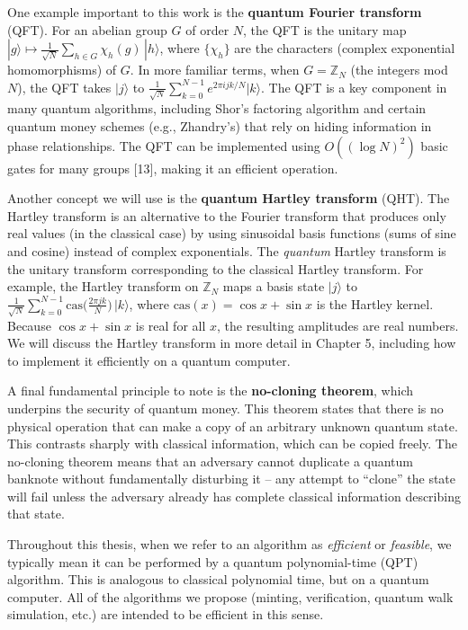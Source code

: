 \documentclass[11pt]{article}
\theoremstyle{definition}
\begin{document}
One example important to this work is the \textbf{quantum Fourier transform} (QFT). For an abelian group $G$ of order $N$, the QFT is the unitary map $|g\rangle \mapsto \frac{1}{\sqrt{N}}\sum_{h \in G} \chi_h(g)\, |h\rangle$, where $\{\chi_h\}$ are the characters (complex exponential homomorphisms) of $G$. In more familiar terms, when $G = \mathbb{Z}_N$ (the integers mod $N$), the QFT takes $|j\rangle$ to $\frac{1}{\sqrt{N}}\sum_{k=0}^{N-1} e^{2\pi i j k / N} |k\rangle$. The QFT is a key component in many quantum algorithms, including Shor’s factoring algorithm and certain quantum money schemes (e.g., Zhandry’s) that rely on hiding information in phase relationships. The QFT can be implemented using $O((\log N)^2)$ basic gates for many groups [13], making it an efficient operation.

Another concept we will use is the \textbf{quantum Hartley transform} (QHT). The Hartley transform is an alternative to the Fourier transform that produces only real values (in the classical case) by using sinusoidal basis functions (sums of sine and cosine) instead of complex exponentials. The \emph{quantum} Hartley transform is the unitary transform corresponding to the classical Hartley transform. For example, the Hartley transform on $\mathbb{Z}_N$ maps a basis state $|j\rangle$ to $\frac{1}{\sqrt{N}}\sum_{k=0}^{N-1} \mathrm{cas}\!\Big(\frac{2\pi j k}{N}\Big)\, |k\rangle$, where $\mathrm{cas}(x) = \cos x + \sin x$ is the Hartley kernel. Because $\cos x + \sin x$ is real for all $x$, the resulting amplitudes are real numbers. We will discuss the Hartley transform in more detail in Chapter 5, including how to implement it efficiently on a quantum computer.

A final fundamental principle to note is the \textbf{no-cloning theorem}, which underpins the security of quantum money. This theorem states that there is no physical operation that can make a copy of an arbitrary unknown quantum state. This contrasts sharply with classical information, which can be copied freely. The no-cloning theorem means that an adversary cannot duplicate a quantum banknote without fundamentally disturbing it – any attempt to “clone” the state will fail unless the adversary already has complete classical information describing that state.

Throughout this thesis, when we refer to an algorithm as \emph{efficient} or \emph{feasible}, we typically mean it can be performed by a quantum polynomial-time (QPT) algorithm. This is analogous to classical polynomial time, but on a quantum computer. All of the algorithms we propose (minting, verification, quantum walk simulation, etc.) are intended to be efficient in this sense.
\end{document}
